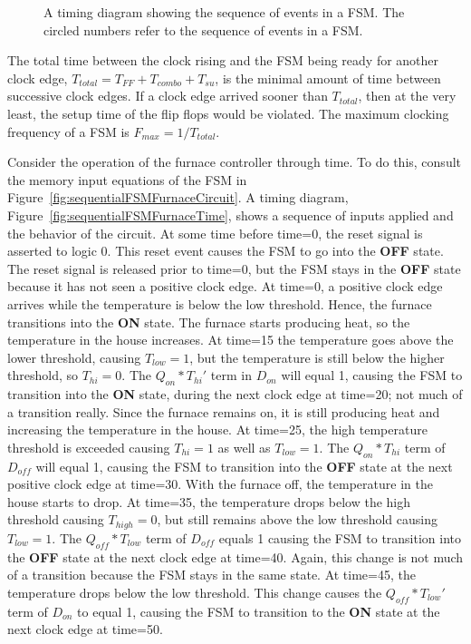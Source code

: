 \begin{figure}[ht]

\caption{A timing diagram showing the sequence of events in a FSM.
The circled numbers refer to the sequence of events in a FSM.}
\label{fig:sequentialFSMGenTime}

\end{figure}
\label{page:GenTime}

The total time between the clock rising and the FSM being ready for another 
clock edge, $T_{total} = T_{FF} + T_{combo} + T_{su}$,  is the minimal 
amount of time between successive clock edges.  If a clock edge arrived 
sooner than $T_{total}$, then at the very least, the setup time of the 
flip flops would be violated.  The maximum clocking frequency 
of a FSM is $F_{max} = 1/T_{total}$.

Consider the operation of the furnace controller through time.
To do this, consult the memory input equations of the
FSM in Figure~\ref{fig:sequentialFSMFurnaceCircuit}.  A timing diagram, Figure~\ref{fig:sequentialFSMFurnaceTime}, 
shows a sequence of inputs applied and the
behavior of the circuit. At some time before time=0, the reset signal is
asserted to logic 0.  This reset event causes the FSM to go into the 
\textbf{ OFF} state.  The 
reset signal is released prior to time=0, but the FSM stays in the \textbf{ OFF}
state because it has not seen a positive clock edge.  At time=0, a positive
clock edge arrives  while the 
temperature is below the low threshold. Hence, the furnace transitions
into the \textbf{ ON} state.  The furnace starts producing heat, so the 
temperature in the house increases. At 
time=15 the temperature goes above the lower threshold, causing 
$T_{low}=1$, but the temperature is still below the higher threshold, so $T_{hi}=0$.
The $Q_{on}*T_{hi}'$ term in $D_{on}$ will equal 1, causing the FSM
to transition into the \textbf{ ON} state, during the next clock edge at time=20; 
not much of a transition really.  Since the furnace remains on, it is
still producing heat and increasing the temperature in the house.
At time=25, the high temperature threshold is exceeded causing
$T_{hi}=1$ as well as $T_{low}=1$.  The $Q_{on}*T_{hi}$ term of
$D_{off}$ will equal 1, causing the FSM to transition into the \textbf{ OFF}
state at the next positive clock edge at time=30.  With the furnace
off, the temperature in the house starts to drop.  At time=35, the
temperature drops below the high threshold causing $T_{high}=0$,
but still remains above the low threshold causing $T_{low}=1$.
The $Q_{off}*T_{low}$ term of $D_{off}$ equals 1 causing the
FSM to transition into the \textbf{ OFF} state at the next clock edge at
time=40.  Again, this change is not much of a transition because the FSM stays
in the same state.  At time=45, the temperature drops below the low 
threshold.  This change causes the $Q_{off}*T_{low}'$ term of $D_{on}$ to 
equal 1, causing the FSM to transition to the \textbf{ ON} state at the next 
clock edge at time=50.

